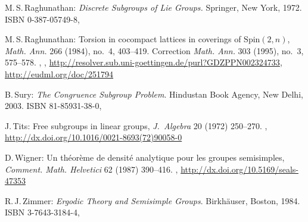 \begin{references}{99}
 M.\,S.\,Raghunathan: 
 \emph{Discrete Subgroups of Lie Groups.}
 Springer, {New York}, 1972.
 ISBN 0-387-05749-8,
 
 M.\,S.\,Raghunathan: 
 Torsion in cocompact lattices in coverings of $\mathrm{Spin}(2,n)$, 
 \emph{Math. Ann.} 266 (1984), no.~4, 403--419.
 Correction \emph{Math. Ann.} 303 (1995), no.~3, 575--578.
 , ,
 \maynewline
  \url{http://resolver.sub.uni-goettingen.de/purl?GDZPPN002324733}, \ 
 \maynewline
\url{http://eudml.org/doc/251794}



B.\,Sury:
\emph{The Congruence Subgroup Problem}. 
 Hindustan Book Agency, New Delhi, 2003.
 ISBN 81-85931-38-0,

 J.\,Tits:
 Free subgroups in linear groups,
 \emph{J.~Algebra} 20 (1972) 250--270.
,
\maynewline
\url{http://dx.doi.org/10.1016/0021-8693(72)90058-0}

 D.\,Wigner:
 Un th\'eor\`eme de densit\'e analytique pour les groupes
semisimples,
 \emph{Comment. Math. Helvetici} 62 (1987) 390--416.
 ,
 \url{http://dx.doi.org/10.5169/seals-47353}

 R.\,J.\,Zimmer:
 \emph{Ergodic Theory and Semisimple Groups}.
 Birkh\"auser, Boston, 1984.
 ISBN 3-7643-3184-4,

 \end{references}

